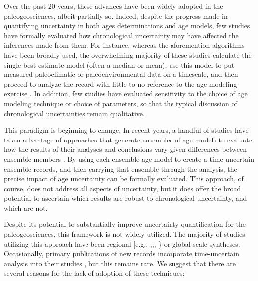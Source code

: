 \documentclass[gchron, manuscript]{copernicus}
\begin{document}
Over the past 20 years, these advances have been widely adopted in the paleogeosciences, albeit partially so.
Indeed, despite the progress made in quantifying uncertainty in both ages determinations and age models, few studies have formally evaluated how chronological uncertainty may have affected the inferences made from them.
For instance, whereas the aforemention algorithms have been broadly used, the overwhelming majority of these studies calculate the single best-estimate model (often a median or mean), use this model to put measured paleoclimatic or paleoenvironmental data on a timescale, and then proceed to analyze the record with little to no reference to the age modeling exercise \citep[\citet{McKay2009}]{McKay2008}. In addition, few studies have evaluated sensitivity to the choice of age modeling technique or choice of parameters, so that
the typical discussion of chronological uncertainties remain qualitative.

This paradigm is beginning to change.
In recent years, a handful of studies have taken advantage of approaches that generate ensembles of age models to evaluate how the results of their analyses and conclusions vary given differences between ensemble members \citep[\citet{Rhines_JGR2011},\citet{Anchukaitis_Tierney2012},\citet{Shakun_Nature2012},\citet{Marcott_Science2013}, \citet{Tierney2013}]{Haam_Huybers2010}.
By using each ensemble age model to create a time-uncertain ensemble records, and then carrying that ensemble through the analysis, the precise impact of age uncertainty can be formally evaluated.
This approach, of course, does not address all aspects of uncertainty, but it does offer the broad potential to ascertain which results are robust to chronological uncertainty, and which are not.

Despite its potential to substantially improve uncertainty quantification for the paleogeosciences, this framework is not widely utilized.
The majority of studies utilizing this approach have been regional {[}e.g., \citet{Anchukaitis_Tierney2012},\citet{Tierney2013},\citet{mckay_onset_2018}, \citet{routson2018}\} or global-scale \citep[e.g.,][\citet{Marcott_Science2013},\citet{kaufman2020HoloceneGMST}]{Shakun_Nature2012} syntheses.
Occasionally, primary publications of new records incorporate time-uncertain analysis into their studies \citep[more]{Boldt2015}, but this remains rare.
We suggest that there are several reasons for the lack of adoption of these techniques:
\end{document}
